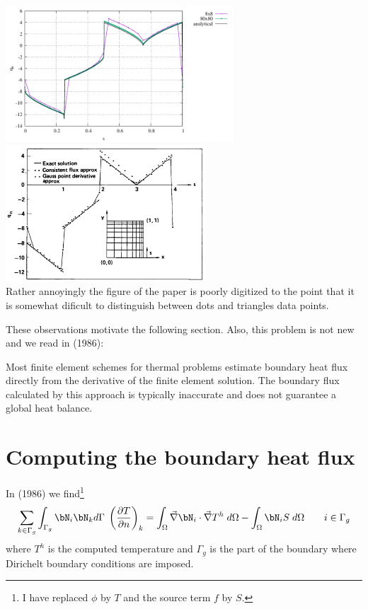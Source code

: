 \begin{center}
\includegraphics[width=8.5cm]{python_codes/fieldstone_173/results/heat_flux_boundary.pdf}
\includegraphics[width=7.5cm]{python_codes/fieldstone_173/images/grls87a}\\
{\captionfont Rather annoyingly the figure of the paper is poorly digitized 
to the point that it is somewhat dificult to distinguish between dots and triangles data points.}
\end{center}

These observations motivate the following section.
Also, this problem is not new and we read in \textcite{mizu86} (1986):
\begin{displayquote}
Most finite element schemes for thermal problems estimate boundary heat flux directly from the
derivative of the finite element solution. The boundary flux calculated by this approach is typically
inaccurate and does not guarantee a global heat balance.
\end{displayquote}

\section*{Computing the boundary heat flux}

In \textcite{mizu86} (1986) we find\footnote{I have replaced $\phi$ by $T$ and 
the source term $f$ by $S$.}
\[
\sum_{k \in \Gamma_g} \int_{\Gamma_g} \bN_i \bN_k d\Gamma \; 
\left(
\frac{\partial T}{\partial n}
\right)_k
=
\int_\Omega \vec\nabla \bN_i \cdot \vec\nabla T^h \; d\Omega
- \int_\Omega \bN_i S \; d\Omega
\qquad
i \in \Gamma_g
\]
where $T^h$ is the computed temperature and $\Gamma_g$ is the part of the 
boundary where Dirichelt boundary conditions are imposed.








